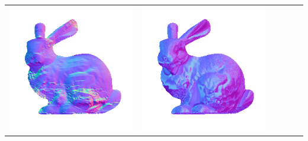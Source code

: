 \begin{tabularx}{\linewidth}{@{}Y@{}Y@{}Y@{}Y@{}Y@{}Y@{}}
\includegraphics[width=\linewidth]{semisynthetic/20150514_14_yu_out.png} &
\includegraphics[width=\linewidth]{semisynthetic/20150514_14_dpsn_out.png} &

\end{tabularx}
